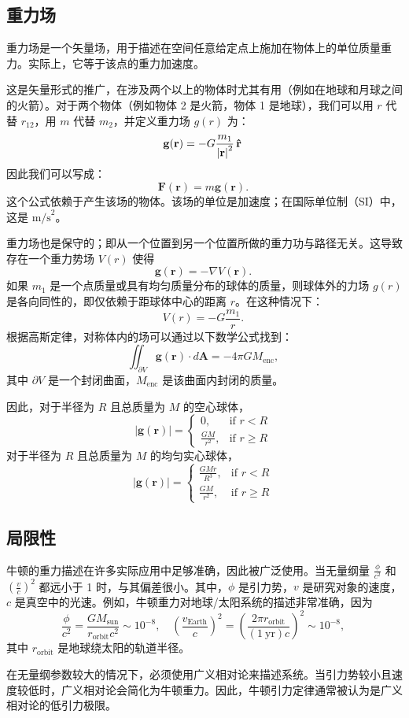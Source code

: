 \subsection{重力场}  
重力场是一个矢量场，用于描述在空间任意给定点上施加在物体上的单位质量重力。实际上，它等于该点的重力加速度。

这是矢量形式的推广，在涉及两个以上的物体时尤其有用（例如在地球和月球之间的火箭）。对于两个物体（例如物体 2 是火箭，物体 1 是地球），我们可以用 \( r \) 代替 \( r_{12} \)，用 \( m \) 代替 \( m_2 \)，并定义重力场 \( g(r) \) 为：
\[
\mathbf {g} (\mathbf {r} )=-G{m_{1} \over {{\vert \mathbf {r} \vert }^{2}}}\,\mathbf {\hat {r}}~
\]
因此我们可以写成：
\[
\mathbf {F} (\mathbf {r} )=m\mathbf {g} (\mathbf {r} ).~
\]
这个公式依赖于产生该场的物体。该场的单位是加速度；在国际单位制（SI）中，这是 \( \text{m/s}^2 \)。

重力场也是保守的；即从一个位置到另一个位置所做的重力功与路径无关。这导致存在一个重力势场 \( V(r) \) 使得
\[
\mathbf {g} (\mathbf {r} )=-\nabla V(\mathbf {r} ).~
\]
如果 \( m_1 \) 是一个点质量或具有均匀质量分布的球体的质量，则球体外的力场 \( g(r) \) 是各向同性的，即仅依赖于距球体中心的距离 \( r \)。在这种情况下：
\[
V(r) = -G \frac{m_1}{r}.~
\]
根据高斯定律，对称体内的场可以通过以下数学公式找到：
\[
\iint_{\partial V} \mathbf{g(r)} \cdot d\mathbf{A} = -4 \pi G M_{\text{enc}},~
\]
其中 \( \partial V \) 是一个封闭曲面，\( M_{\text{enc}} \) 是该曲面内封闭的质量。

因此，对于半径为 \( R \) 且总质量为 \( M \) 的空心球体，
\[
|\mathbf{g(r)}| = 
\begin{cases} 
0, & \text{if } r < R \\ 
\frac{GM}{r^2}, & \text{if } r \geq R 
\end{cases}~
\]
对于半径为 \( R \) 且总质量为 \( M \) 的均匀实心球体，
\[
|\mathbf{g(r)}| = 
\begin{cases} 
\frac{GMr}{R^3}, & \text{if } r < R \\ 
\frac{GM}{r^2}, & \text{if } r \geq R 
\end{cases}~
\]

\subsection{局限性}
牛顿的重力描述在许多实际应用中足够准确，因此被广泛使用。当无量纲量 \(\frac{\phi}{c^2}\) 和 \(\left(\frac{v}{c}\right)^2\) 都远小于 1 时，与其偏差很小。其中，\(\phi\) 是引力势，\(v\) 是研究对象的速度，\(c\) 是真空中的光速。例如，牛顿重力对地球/太阳系统的描述非常准确，因为
\[
\frac{\phi}{c^2} = \frac{GM_{\text{sun}}}{r_{\text{orbit}} c^2} \sim 10^{-8}, \quad \left(\frac{v_{\text{Earth}}}{c}\right)^2 = \left(\frac{2 \pi r_{\text{orbit}}}{(1\ \text{yr}) c}\right)^2 \sim 10^{-8},~
\]
其中 \(r_{\text{orbit}}\) 是地球绕太阳的轨道半径。

在无量纲参数较大的情况下，必须使用广义相对论来描述系统。当引力势较小且速度较低时，广义相对论会简化为牛顿重力。因此，牛顿引力定律通常被认为是广义相对论的低引力极限。


